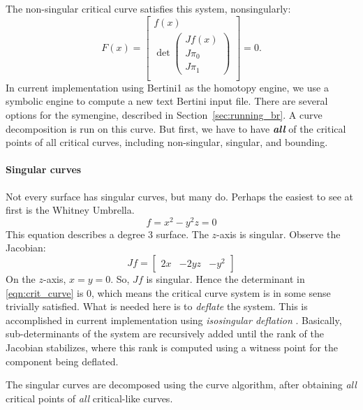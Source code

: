 The non-singular critical curve satisfies this system, nonsingularly:
\begin{equation}\label{eqn:crit_curve}
    F(x) = \begin{bmatrix}
f(x) \\
\det \begin{pmatrix}
    Jf(x) \\
    J\pi_0 \\
    J\pi_1
            \end{pmatrix} \\
\end{bmatrix} = 0.
\end{equation}
In current implementation using Bertini1 as the homotopy engine, we use a symbolic engine to compute a new text Bertini input file.  There are several options for the symengine, described in Section~\ref{sec:running_br}.  A curve decomposition is run on this curve.  But first, we have to have {\em \bf all} of the critical points of all critical curves, including non-singular, singular, and bounding.


\paragraph{Singular curves}

Not every surface has singular curves, but many do.  Perhaps the easiest to see at first is the Whitney Umbrella.
\begin{equation}
f = x^2 - y^2 z = 0
\end{equation}
This equation describes a degree 3 surface.  The $z$-axis is singular.  Observe the Jacobian:
\begin{equation}
Jf = \begin{bmatrix}
2x & -2yz & -y^2
\end{bmatrix}
\end{equation}
On the $z$-axis, $x = y = 0$.  So, $Jf$ is singular.  Hence the determinant in \eqref{eqn:crit_curve} is $0$, which means the critical curve system is in some sense trivially satisfied.  What is needed here is to {\em deflate} the system.  This is accomplished in current implementation using {\em isosingular deflation} \cite{hauenstein2013isosingular}.  Basically, sub-determinants of the system are recursively added until the rank of the Jacobian stabilizes, where this rank is computed using a witness point for the component being deflated.

The singular curves are decomposed using the curve algorithm, after obtaining {\em all} critical points of {\em all} critical-like curves.

